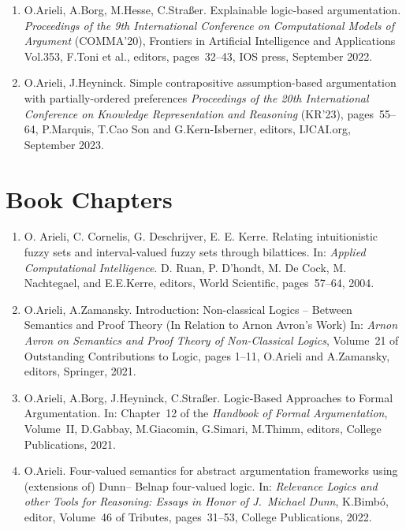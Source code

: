 \documentclass{article}
\begin{document}
\begin{enumerate}
  \item O.Arieli, A.Borg, M.Hesse, C.Stra{\ss}er.
           Explainable logic-based argumentation.
           {\em Proceedings of the 9th International Conference on Computational Models of Argument\/} (COMMA'20),
           Frontiers in Artificial Intelligence and Applications Vol.353, F.Toni et al., editors, pages~32--43, IOS press, September 2022.

  \item O.Arieli, J.Heyninck.
           Simple contrapositive assumption-based argumentation with partially-ordered preferences
           {\em Proceedings of the 20th International Conference on Knowledge Representation and Reasoning\/} (KR'23),
           pages~55--64, P.Marquis, T.Cao Son and G.Kern-Isberner, editors, IJCAI.org, September 2023.

\end{enumerate}


\section*{Book Chapters}

\begin{enumerate}

 \item O. Arieli, C. Cornelis, G. Deschrijver, E. E. Kerre.        
          Relating intuitionistic fuzzy sets and interval-valued fuzzy sets through bilattices. In: {\em Applied Computational Intelligence\/}.
          D. Ruan, P. D'hondt, M. De Cock, M. Nachtegael, and E.E.Kerre, editors, World Scientific, pages~57--64, 2004.

  \item O.Arieli, A.Zamansky.
          Introduction: Non-classical Logics -- Between Semantics and Proof Theory (In Relation to Arnon Avron's Work)
          In: {\em Arnon Avron on Semantics and Proof Theory of Non-Classical Logics\/}, Volume~21 of Outstanding
          Contributions to Logic, pages 1--11, O.Arieli and A.Zamansky, editors, Springer, 2021.

  \item O.Arieli, A.Borg, J.Heyninck, C.Stra{\ss}er.
           Logic-Based Approaches to Formal Argumentation. In: Chapter~12 of the {\em Handbook of Formal Argumentation\/},
           Volume~II, D.Gabbay, M.Giacomin, G.Simari, M.Thimm, editors, College Publications, 2021.
           
  \item O.Arieli.
           Four-valued semantics for abstract argumentation frameworks using (extensions of) Dunn--{\allowbreak}
           Belnap four-valued logic. In: {\em Relevance Logics and other Tools for Reasoning: Essays in Honor of
           J.~Michael Dunn\/}, K.Bimb\'o, editor, Volume~46 of Tributes, pages~31--53, College Publications, 2022.         

\end{enumerate}
\end{document}
